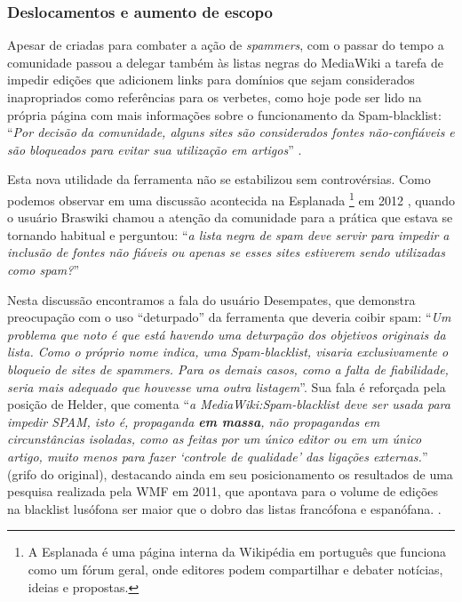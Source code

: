 \subsubsection{Deslocamentos e aumento de escopo}

Apesar de criadas para combater a ação de \textit{spammers}, com o passar do tempo a comunidade passou a delegar também às listas negras do MediaWiki a tarefa de impedir edições que adicionem links para domínios que sejam considerados inapropriados como referências para os verbetes, como hoje pode ser lido na própria página com mais informações sobre o funcionamento da Spam-blacklist: ``\textit{Por decisão da comunidade, alguns sites são considerados fontes não-confiáveis e são bloqueados para evitar sua utilização em artigos}'' .

Esta nova utilidade da ferramenta não se estabilizou sem controvérsias. Como podemos observar em uma discussão acontecida na Esplanada \footnote{A Esplanada é uma página interna da Wikipédia em português que funciona como um fórum geral, onde editores podem compartilhar e debater notícias, ideias e propostas.} em 2012 , quando o usuário Braswiki chamou a atenção da comunidade para a prática que estava se tornando habitual e perguntou: ``\textit{a lista negra de spam deve servir para impedir a inclusão de fontes não fiáveis ou apenas se esses sites estiverem sendo utilizadas como spam?}''

Nesta discussão encontramos a fala do usuário Desempates, que demonstra preocupação com o uso ``deturpado'' da ferramenta que deveria coibir spam: ``\textit{Um problema que noto é que está havendo uma deturpação dos objetivos originais da lista. Como o próprio nome indica, uma Spam-blacklist, visaria exclusivamente o bloqueio de sites de spammers. Para os demais casos, como a falta de fiabilidade, seria mais adequado que houvesse uma outra listagem}''. Sua fala é reforçada pela posição de Helder, que comenta ``\textit{a MediaWiki:Spam-blacklist deve ser usada para impedir SPAM, isto é, propaganda \textbf{em massa}, não propagandas em circunstâncias isoladas, como as feitas por um único editor ou em um único artigo, muito menos para fazer  ‘controle de qualidade’ das ligações externas.}'' (grifo do original), destacando ainda em seu posicionamento os resultados de uma pesquisa realizada pela WMF em 2011, que apontava para o volume de edições na blacklist lusófona ser maior que o dobro das listas francófona e espanófana. .

